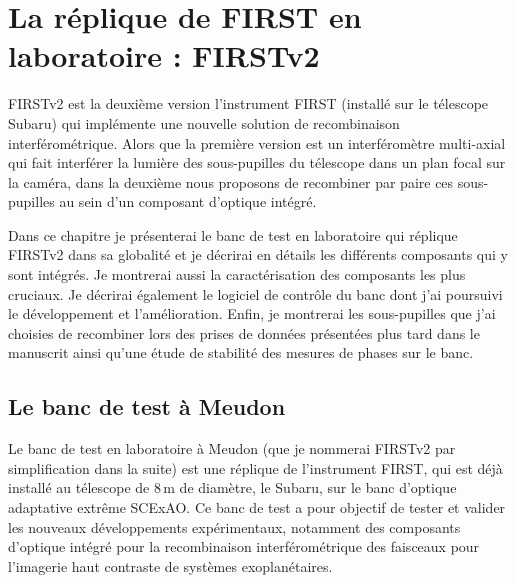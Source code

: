 \chapter{La réplique de FIRST en laboratoire : FIRSTv2}
\label{sec:FIRSTv2Concept}
\setcounter{figure}{0}
\setcounter{table}{0}
\setcounter{equation}{0}

\minitoc

\clearpage
\ac{FIRSTv2} est la deuxième version l'instrument \ac{FIRST} (installé sur le télescope Subaru) qui implémente une nouvelle solution de recombinaison interférométrique. Alors que la première version est un interféromètre multi-axial qui fait interférer la lumière des sous-pupilles du télescope dans un plan focal sur la caméra, dans la deuxième nous proposons de recombiner par paire ces sous-pupilles au sein d'un composant d'optique intégré.

Dans ce chapitre je présenterai le banc de test en laboratoire qui réplique \ac{FIRSTv2} dans sa globalité et je décrirai en détails les différents composants qui y sont intégrés. Je montrerai aussi la caractérisation des composants les plus cruciaux. Je décrirai également le logiciel de contrôle du banc dont j'ai poursuivi le développement et l'amélioration. Enfin, je montrerai les sous-pupilles que j'ai choisies de recombiner lors des prises de données présentées plus tard dans le manuscrit ainsi qu'une étude de stabilité des mesures de phases sur le banc.


\section{Le banc de test à Meudon}

Le banc de test en laboratoire à Meudon (que je nommerai \ac{FIRSTv2} par simplification dans la suite) est une réplique de l'instrument \ac{FIRST}, qui est déjà installé au télescope de $8 \,$m de diamètre, le Subaru, sur le banc d'optique adaptative extrême \ac{SCExAO}. Ce banc de test a pour objectif de tester et valider les nouveaux développements expérimentaux, notamment des composants d'optique intégré pour la recombinaison interférométrique des faisceaux pour l'imagerie haut contraste de systèmes exoplanétaires.

